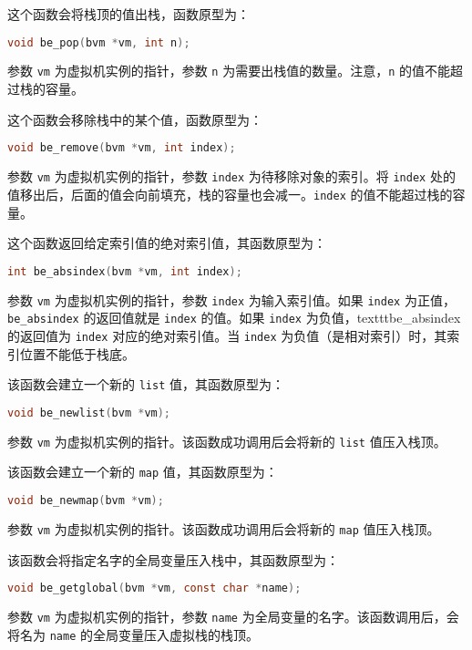 
这个函数会将栈顶的值出栈，函数原型为：
\begin{lstlisting}[language=c, style=berry, numbers=none]
void be_pop(bvm *vm, int n);
\end{lstlisting}
参数 \texttt{vm} 为虚拟机实例的指针，参数 \texttt{n} 为需要出栈值的数量。注意，\texttt{n} 的值不能超过栈的容量。


这个函数会移除栈中的某个值，函数原型为：
\begin{lstlisting}[language=c, style=berry, numbers=none]
void be_remove(bvm *vm, int index);
\end{lstlisting}
参数 \texttt{vm} 为虚拟机实例的指针，参数 \texttt{index} 为待移除对象的索引。将 \texttt{index} 处的值移出后，后面的值会向前填充，栈的容量也会减一。\texttt{index} 的值不能超过栈的容量。


这个函数返回给定索引值的绝对索引值，其函数原型为：
\begin{lstlisting}[language=c, style=berry, numbers=none]
int be_absindex(bvm *vm, int index);
\end{lstlisting}
参数 \texttt{vm} 为虚拟机实例的指针，参数 \texttt{index} 为输入索引值。如果 \texttt{index} 为正值，\texttt{be\_absindex} 的返回值就是 \texttt{index} 的值。如果 \texttt{index} 为负值，texttt{be\_absindex} 的返回值为 \texttt{index} 对应的绝对索引值。当 \texttt{index} 为负值（是相对索引）时，其索引位置不能低于栈底。


该函数会建立一个新的 \texttt{list} 值，其函数原型为：
\begin{lstlisting}[language=c, style=berry, numbers=none]
void be_newlist(bvm *vm);
\end{lstlisting}
参数 \texttt{vm} 为虚拟机实例的指针。该函数成功调用后会将新的 \texttt{list} 值压入栈顶。


该函数会建立一个新的 \texttt{map} 值，其函数原型为：
\begin{lstlisting}[language=c, style=berry, numbers=none]
void be_newmap(bvm *vm);
\end{lstlisting}
参数 \texttt{vm} 为虚拟机实例的指针。该函数成功调用后会将新的 \texttt{map} 值压入栈顶。


该函数会将指定名字的全局变量压入栈中，其函数原型为：
\begin{lstlisting}[language=c, style=berry, numbers=none]
void be_getglobal(bvm *vm, const char *name);
\end{lstlisting}
参数 \texttt{vm} 为虚拟机实例的指针，参数 \texttt{name} 为全局变量的名字。该函数调用后，会将名为 \texttt{name} 的全局变量压入虚拟栈的栈顶。

